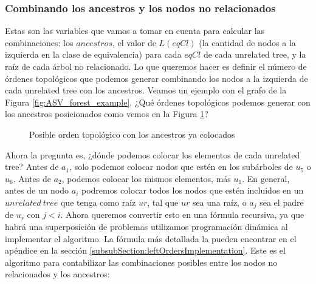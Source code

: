 
\subsubsection{Combinando los ancestros y los nodos no relacionados}

Estas son las variables que vamos a tomar en cuenta para calcular las combinaciones: los $ancestros$, el valor de $L(eqCl)$ (la cantidad de nodos a la izquierda en la clase de equivalencia) para cada $eqCl$ de cada unrelated tree, y la raíz de cada árbol no relacionado. Lo que queremos hacer es definir el número de órdenes topológicos que podemos generar combinando los nodos a la izquierda de cada unrelated tree con los ancestros. Veamos un ejemplo con el grafo de la Figura \ref{fig:ASV_forest_example}. ¿Qué órdenes topológicos podemos generar con los ancestros posicionados como vemos en la Figura \ref{fig:order_of_ancestors}?

\begin{figure}[ht]
    \centering
    \caption{Posible orden topológico con los ancestros ya colocados}
    \label{fig:order_of_ancestors}
\end{figure}

Ahora la pregunta es, ¿dónde podemos colocar los elementos de cada unrelated tree? Antes de $a_1$, solo podemos colocar nodos que estén en los subárboles de $u_5$ o $u_6$. Antes de $a_2$, podemos colocar los mismos elementos, más $u_1$. En general, antes de un nodo $a_i$ podremos colocar todos los nodos que estén incluidos en un $unrelated \ tree$ que tenga como raíz $ur$, tal que $ur$ sea una raíz, o $a_j$ sea el padre de $u_r$ con $j<i$. Ahora queremos convertir esto en una fórmula recursiva, ya que habrá una superposición de problemas utilizamos programación dinámica al implementar el algoritmo. La fórmula más detallada la pueden encontrar en el apéndice en la sección \ref{subsubSection:leftOrdersImplementation}. Este es el algoritmo para contabilizar las combinaciones posibles entre los nodos no relacionados y los ancestros:\\

